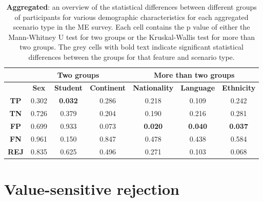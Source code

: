 \begin{table}
    \small
    \centering
    \begin{tabular}{cccc|ccc}
        \toprule
                     & \multicolumn{3}{c}{\textbf{Two groups}} & \multicolumn{3}{c}{\textbf{More than two groups}}                                                                                                                                                                       \\
        \midrule
                     & \multicolumn{1}{c}{\textbf{Sex}}        & \multicolumn{1}{c}{\textbf{Student}}              & \multicolumn{1}{c}{\textbf{Continent}} & \multicolumn{1}{c}{\textbf{Nationality}} & \multicolumn{1}{c}{\textbf{Language}}  & \multicolumn{1}{c}{\textbf{Ethnicity}} \\
        \midrule
        \textbf{TP}  & 0.302                                   & \cellcolor[HTML]{EFEFEF}\textbf{0.032}            & 0.286                                  & 0.218                                    & 0.109                                  & 0.242                                  \\
        \textbf{TN}  & 0.726                                   & 0.379                                             & 0.204                                  & 0.190                                    & 0.216                                  & 0.281                                  \\
        \textbf{FP}  & 0.699                                   & 0.933                                             & 0.073                                  & \cellcolor[HTML]{EFEFEF}\textbf{0.020}   & \cellcolor[HTML]{EFEFEF}\textbf{0.040} & \cellcolor[HTML]{EFEFEF}\textbf{0.037} \\
        \textbf{FN}  & 0.961                                   & 0.150                                             & 0.847                                  & 0.478                                    & 0.438                                  & 0.584                                  \\
        \textbf{REJ} & 0.835                                   & 0.625                                             & 0.496                                  & 0.271                                    & 0.103                                  & 0.068                                  \\
        \bottomrule
    \end{tabular}
    \caption{\textbf{Aggregated}: an overview of the statistical differences between different groups of participants for various demographic characteristics for each aggregated scenario type in the ME survey. Each cell contains the p value of either the Mann-Whitney U test for two groups or the Kruskal-Wallis test for more than two groups. The grey cells with bold text indicate significant statistical differences between the groups for that feature and scenario type.}
    \label{tab:results-differences-grp}
\end{table}

\section{Value-sensitive rejection}
\label{sec:results-rejector}
